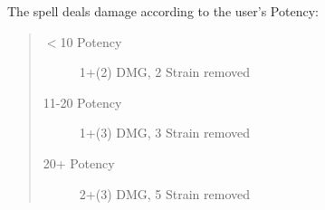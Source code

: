 \documentclass[11pt,a4paper,twocolumn]{book}
\begin{document}
The spell deals damage according to the user's Potency:
\begin{quote}
	\begin{description}
		\item[$<$10 Potency] 	1+(2) DMG, 2 Strain removed
		\item[11-20 Potency] 1+(3) DMG, 3 Strain removed
		\item[20+ Potency] 	    2+(3) DMG, 5 Strain removed
	\end{description}	
\end{quote}

%	
%
%
%


\end{document}
